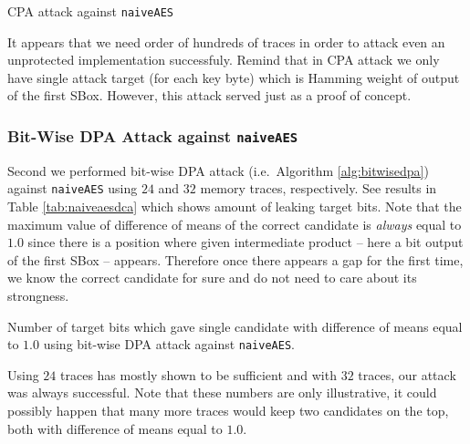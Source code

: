 	\begin{table}[h]
		\begin{center}
		
		\end{center}
	\caption{CPA attack against {\tt naiveAES}}
	\label{tab:naiveaescpa}
	\end{table}
	
	It appears that we need order of hundreds of traces in order to attack even an unprotected implementation successfuly. Remind that in CPA attack we only have single attack target (for each key byte) which is Hamming weight of output of the first SBox. However, this attack served just as a proof of concept.

\subsubsection{Bit-Wise DPA Attack against {\tt naiveAES}}
	
	Second we performed bit-wise DPA attack (i.e.\ Algorithm \ref{alg:bitwisedpa}) against {\tt naiveAES} using $24$ and $32$ memory traces, respectively. See results in Table \ref{tab:naiveaesdca} which shows amount of leaking target bits. Note that the maximum value of difference of means of the correct candidate is {\em always} equal to $1.0$ since there is a position where given intermediate product -- here a bit output of the first SBox -- appears. Therefore once there appears a gap for the first time, we know the correct candidate for sure and do not need to care about its strongness.
	
	\begin{table}[h]
		\begin{center}
		
		\end{center}
	\caption{Number of target bits which gave single candidate with difference of means equal to $1.0$ using bit-wise DPA attack against {\tt naiveAES}.}
	\label{tab:naiveaesdca}
	\end{table}
	
	Using $24$ traces has mostly shown to be sufficient and with $32$ traces, our attack was always successful. Note that these numbers are only illustrative, it could possibly happen that many more traces would keep two candidates on the top, both with difference of means equal to $1.0$.
	


